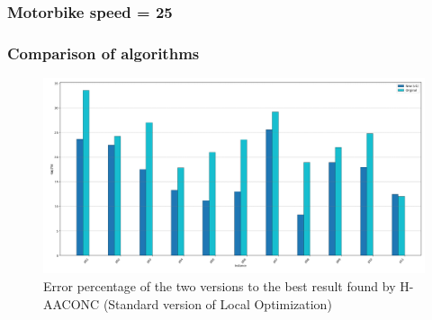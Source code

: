 \documentclass{article}
\begin{document}
	\subsubsection{Motorbike speed = 25}
	\;
	\;
	\;
	\newpage
	\subsubsection{Comparison of algorithms}
	\;
	\begin{figure}[h]
		\caption[width=\textwidth]{Error percentage of the two versions to the best result found by H-AACONC (Standard version of  Local Optimization)}
		\includegraphics[width=\textwidth]{gaps_to_Hybrid_Standard}
		\centering
	\end{figure}
	
\end{document}
